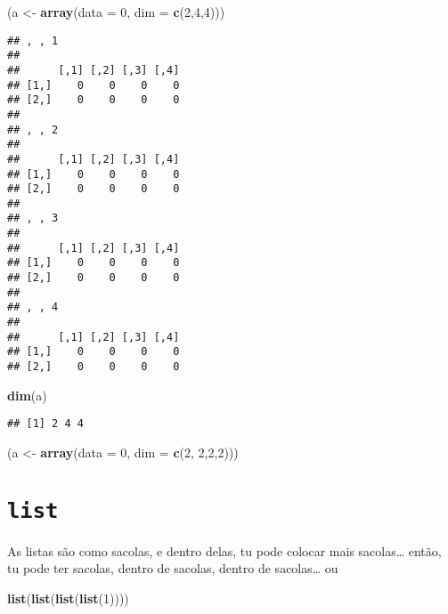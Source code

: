 \documentclass[]{book}
\newenvironment{Shaded}{\begin{snugshade}}{\end{snugshade}}
\newcommand{\KeywordTok}[1]{\textcolor[rgb]{0.13,0.29,0.53}{\textbf{#1}}}
\newcommand{\DataTypeTok}[1]{\textcolor[rgb]{0.13,0.29,0.53}{#1}}
\newcommand{\DecValTok}[1]{\textcolor[rgb]{0.00,0.00,0.81}{#1}}
\newcommand{\StringTok}[1]{\textcolor[rgb]{0.31,0.60,0.02}{#1}}
\newcommand{\NormalTok}[1]{#1}
\theoremstyle{definition}
\theoremstyle{definition}
\theoremstyle{definition}
\theoremstyle{remark}
\begin{document}
\begin{Shaded}
\begin{Highlighting}[]
\NormalTok{(a <-}\StringTok{ }\KeywordTok{array}\NormalTok{(}\DataTypeTok{data =} \DecValTok{0}\NormalTok{, }\DataTypeTok{dim =} \KeywordTok{c}\NormalTok{(}\DecValTok{2}\NormalTok{,}\DecValTok{4}\NormalTok{,}\DecValTok{4}\NormalTok{)))}
\end{Highlighting}
\end{Shaded}

\begin{verbatim}
## , , 1
## 
##      [,1] [,2] [,3] [,4]
## [1,]    0    0    0    0
## [2,]    0    0    0    0
## 
## , , 2
## 
##      [,1] [,2] [,3] [,4]
## [1,]    0    0    0    0
## [2,]    0    0    0    0
## 
## , , 3
## 
##      [,1] [,2] [,3] [,4]
## [1,]    0    0    0    0
## [2,]    0    0    0    0
## 
## , , 4
## 
##      [,1] [,2] [,3] [,4]
## [1,]    0    0    0    0
## [2,]    0    0    0    0
\end{verbatim}

\begin{Shaded}
\begin{Highlighting}[]
\KeywordTok{dim}\NormalTok{(a)}
\end{Highlighting}
\end{Shaded}

\begin{verbatim}
## [1] 2 4 4
\end{verbatim}

\begin{Shaded}
\begin{Highlighting}[]
\NormalTok{(a <-}\StringTok{ }\KeywordTok{array}\NormalTok{(}\DataTypeTok{data =} \DecValTok{0}\NormalTok{, }\DataTypeTok{dim =} \KeywordTok{c}\NormalTok{(}\DecValTok{2}\NormalTok{, }\DecValTok{2}\NormalTok{,}\DecValTok{2}\NormalTok{,}\DecValTok{2}\NormalTok{)))}
\end{Highlighting}
\end{Shaded}

\section{\texorpdfstring{\texttt{list}}{list}}\label{list}

As listas são como sacolas, e dentro delas, tu pode colocar mais
sacolas\ldots{} então, tu pode ter sacolas, dentro de sacolas, dentro de
sacolas\ldots{} ou

\begin{Shaded}
\begin{Highlighting}[]
\KeywordTok{list}\NormalTok{(}\KeywordTok{list}\NormalTok{(}\KeywordTok{list}\NormalTok{(}\KeywordTok{list}\NormalTok{(}\DecValTok{1}\NormalTok{))))}
\end{Highlighting}
\end{Shaded}
\end{document}
